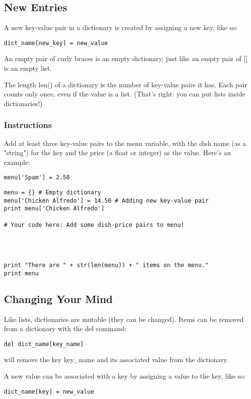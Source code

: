 \documentclass[12pt,a4paper,final,twoside,onecolumn,titlepage]{book}
\begin{document}
\subsection{New Entries}

A new key-value pair in a dictionary is created by assigning a new key, like so:
\begin{lstlisting}
dict_name[new_key] = new_value
\end{lstlisting}
An empty pair of curly braces {} is an empty dictionary, just like an empty pair of [] is an empty list.

The length len() of a dictionary is the number of key-value pairs it has. Each pair counts only once, even if the value is a list. (That's right: you can put lists inside dictionaries!)
\subsubsection{Instructions}

Add at least three key-value pairs to the menu variable, with the dish name (as a "string") for the key and the price (a float or integer) as the value. Here's an example:
\begin{lstlisting}
menu['Spam'] = 2.50
\end{lstlisting}

\begin{lstlisting}
menu = {} # Empty dictionary
menu['Chicken Alfredo'] = 14.50 # Adding new key-value pair
print menu['Chicken Alfredo']

# Your code here: Add some dish-price pairs to menu!




print "There are " + str(len(menu)) + " items on the menu."
print menu
\end{lstlisting}

\subsection{Changing Your Mind}

Like lists, dictionaries are mutable (they can be changed). Items can be removed from a dictionary with the del command:
\begin{lstlisting}
del dict_name[key_name]
\end{lstlisting}
will remove the key key\_name and its associated value from the dictionary.

A new value can be associated with a key by assigning a value to the key, like so:
\begin{lstlisting}
dict_name[key] = new_value
\end{lstlisting}
\end{document}
